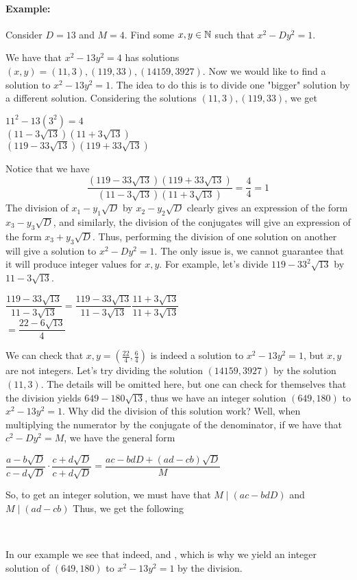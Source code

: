 \documentclass[../main.tex]{subfiles}
\begin{document}
\paragraph{Example:} Consider $D=13$ and $M=4$. Find some $x,y \in \mathbb{N}$ such that $x^2-Dy^2=1$.
\begin{ans}
    We have that $x^2-13y^2=4$ has solutions $(x,y)=(11,3),(119,33),(14159,3927)$. Now we would like to find a solution to $x^2-13y^2=1$. The idea to do this is to divide one "bigger" solution by a different solution. Considering the solutions $(11,3),(119,33)$, we get 
    \begin{center}
        $11^2-13(3^2)=4$ \\
        $(11-3\sqrt{13})(11+3\sqrt{13})$ \\
        $(119-33\sqrt{13})(119+33\sqrt{13})$
    \end{center}
    Notice that we have $$\dfrac{(119-33\sqrt{13})(119+33\sqrt{13})}{(11-3\sqrt{13})(11+3\sqrt{13})}=\dfrac{4}{4}=1$$
    The division of $x_1-y_1\sqrt{D}$ by $x_2-y_2\sqrt{D}$ clearly gives an expression of the form $x_3-y_3\sqrt{D}$, and similarly, the division of the conjugates will give an expression of the form $x_3+y_3\sqrt{D}$. Thus, performing the division of one solution on another will give a solution to $x^2-Dy^2=1$. The only issue is, we cannot guarantee that it will produce integer values for $x,y$. For example, let's divide $119-33^2\sqrt{13}$ by $11-3\sqrt{13}$. 
    \begin{center}
        $\dfrac{119-33\sqrt{13}}{11-3\sqrt{13}}=\dfrac{119-33\sqrt{13}}{11-3\sqrt{13}}\dfrac{11+3\sqrt{13}}{11+3\sqrt{13}}$ \\
        $=\dfrac{22-6\sqrt{13}}{4}$
    \end{center}
    We can check that $x,y=(\tfrac{22}{4},\tfrac{6}{4})$ is indeed a solution to $x^2-13y^2=1$, but $x,y$ are not integers. Let's try dividing the solution $(14159,3927)$ by the solution $(11,3)$. The details will be omitted here, but one can check for themselves that the division yields $649-180\sqrt{13}$, thus we have an integer solution $(649,180)$ to $x^2-13y^2=1$. Why did the division of this solution work? Well, when multiplying the numerator by the conjugate of the denominator, if we have that $c^2-Dy^2=M$, we have the general form
    \begin{center}
        $\dfrac{a-b\sqrt{D}}{c-d\sqrt{D}}\cdot\dfrac{c+d\sqrt{D}}{c+d\sqrt{D}}=\dfrac{ac-bdD+(ad-cb)\sqrt{D}}{M}$
    \end{center}
    So, to get an integer solution, we must have that $M \mid (ac-bdD)$ and $M \mid (ad-cb)$ Thus, we get the following
    \begin{center}
         \\
    \end{center}
    In our example we see that indeed,  and , which is why we yield an integer solution of $(649,180)$ to $x^2-13y^2=1$ by the division.
\end{ans}
\end{document}
